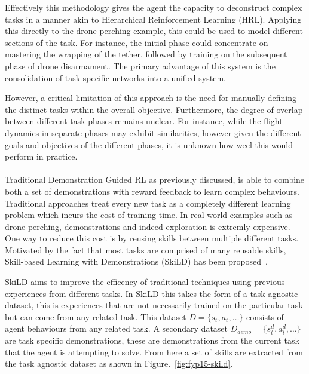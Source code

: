 Effectively this methodology gives the agent the capacity to deconstruct complex tasks in a manner akin to Hierarchical Reinforcement Learning (HRL). 
Applying this directly to the drone perching example, this could be used to model different sections of the task.
For instance, the initial phase could concentrate on mastering the wrapping of the tether, followed by training on the subsequent phase of drone disarmament. 
The primary advantage of this system is the consolidation of task-specific networks into a unified system.

However, a critical limitation of this approach is the need for manually defining the distinct tasks within the overall objective. 
Furthermore, the degree of overlap between different task phases remains unclear. 
For instance, while the flight dynamics in separate phases may exhibit similarities, however given the different goals and objectives of the different phases, it is unknown how weel this would perform in practice. \\\\


Traditional Demonstration Guided RL as previously discussed, is able to combine both a set of demonstrations with reward feedback to learn complex behaviours.
Traditional approaches treat every new task as a completely different learning problem which incurs the cost of training time.
In real-world examples such as drone perching, demonstrations and indeed exploration is extremly expensive.
One way to reduce this cost is by reusing skills between multiple different tasks.
Motivated by the fact that most tasks are comprised of many reusable skills, Skill-based Learning with Demonstrations (SkiLD) has been proposed~\cite{fyp15-demo-guided-rl-with-skills}.

SkiLD aims to improve the efficency of traditional techniques using previous experiences from different tasks.
In SkiLD this takes the form of a task agnostic dataset, this is experiences that are not necessarily trained on the particular task but can come from any related task.
This dataset $D = \{s_t, a_t, \dots\}$ consists of agent behaviours from any related task.
A secondary dataset $D_{demo} = \{s_{t}^{d}, a_{t}^{d}, \dots\}$ are task specific demonstrations, these are demonstrations from the current task that the agent is attempting to solve.
From here a set of skills are extracted from the task agnostic dataset as shown in Figure.~\ref{fig:fyp15-skild}.

